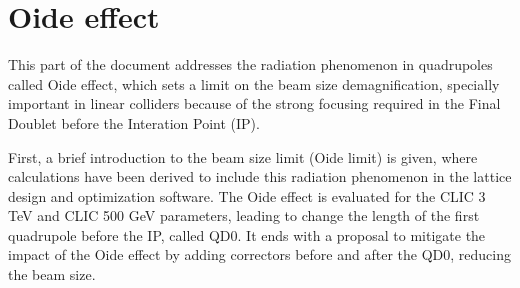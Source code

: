 \chapter{Oide effect}
This part of the document addresses the radiation phenomenon in quadrupoles called Oide effect\cite{Oide}, which sets a limit on the beam size demagnification, specially important in linear colliders because of the strong focusing required in the Final Doublet before the Interation Point (IP).\par
First, a brief introduction to the beam size limit (Oide limit) is given, where calculations have been derived to include this radiation phenomenon in the lattice design and optimization software. The Oide effect is evaluated for the CLIC 3 TeV and CLIC 500 GeV parameters, leading to change the length of the first quadrupole before the IP, called QD0. It ends with a proposal to mitigate the impact of the Oide effect by adding correctors before and after the QD0, reducing the beam size.\par
